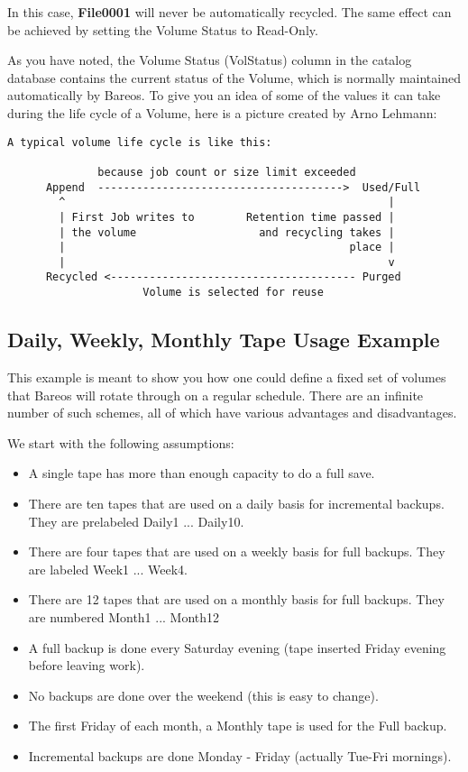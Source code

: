 In this case, {\bf File0001} will never be automatically recycled. The same
effect can be achieved by setting the Volume Status to Read-Only.

As you have noted, the Volume Status (VolStatus) column in the
catalog database contains the current status of the Volume, which
is normally maintained automatically by Bareos. To give you an
idea of some of the values it can take during the life cycle of
a Volume, here is a picture created by Arno Lehmann:

\footnotesize
\begin{verbatim}
A typical volume life cycle is like this:

              because job count or size limit exceeded
      Append  -------------------------------------->  Used/Full
        ^                                                  |
        | First Job writes to        Retention time passed |
        | the volume                   and recycling takes |
        |                                            place |
        |                                                  v
      Recycled <-------------------------------------- Purged
                     Volume is selected for reuse

\end{verbatim}
\normalsize


\subsection{Daily, Weekly, Monthly Tape Usage Example}

This example is meant to show you how one could define a fixed set of volumes
that Bareos will rotate through on a regular schedule. There are an infinite
number of such schemes, all of which have various advantages and
disadvantages.

We start with the following assumptions:

\begin{itemize}
\item A single tape has more than enough capacity to do  a full save.
\item There are ten tapes that are used on a daily basis  for incremental
   backups. They are prelabeled Daily1 ...  Daily10.
\item There are four tapes that are used on a weekly basis  for full backups.
   They are labeled Week1 ... Week4.
\item There are 12 tapes that are used on a monthly basis  for full backups.
   They are numbered Month1 ... Month12
\item A full backup is done every Saturday evening (tape inserted  Friday
   evening before leaving work).
\item No backups are done over the weekend (this is easy to  change).
\item The first Friday of each month, a Monthly tape is used for  the Full
   backup.
\item Incremental backups are done Monday - Friday (actually  Tue-Fri
   mornings).
   \end{itemize}

